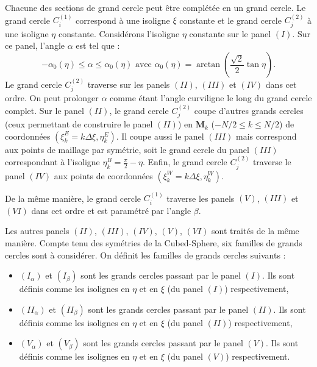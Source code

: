 Chacune des sections de grand cercle peut être complétée en un grand cercle. Le grand cercle $C_i^{(1)}$ correspond à une isoligne $\xi$ constante et le grand cercle $C_j^{(2)}$ à une isoligne $\eta$ constante. Considérons l'isoligne $\eta$ constante sur le panel $(I)$. Sur ce panel, l'angle $\alpha$ est tel que :
\begin{equation}
- \alpha_0 (\eta) \leq \alpha \leq \alpha_0(\eta) \text{ avec } \alpha_0( \eta) = \arctan \left( \dfrac{\sqrt{2}}{2} \tan \eta \right).
\end{equation}
Le grand cercle $C_j^{(2)}$ traverse sur les panels $(II)$, $(III)$ et $(IV)$ dans cet ordre. On peut prolonger $\alpha$ comme étant l'angle curviligne le long du grand cercle complet. Sur le panel $(II)$, le grand cercle $C_j^{(2)}$ coupe d'autres grands cercles (ceux permettant de construire le panel $(II)$) en $\mathbf{M}_k$ ($-N/2 \leq k \leq N/2$) de coordonnées $(\xi^E_k = k \Delta \xi, \eta^E_k)$. Il coupe aussi le panel $(III)$ mais correspond aux points de maillage par symétrie, soit le grand cercle du panel $(III)$ correspondant à l'isoligne $\eta^B_k = \frac{\pi}{2} - \eta$. Enfin, le grand cercle $C_j^{(2)}$ traverse le panel $(IV)$ aux points de coordonnées $(\xi^W_k = k \Delta \xi, \eta^W_k)$. 

De la même manière, le grand cercle $C_i^{(1)}$ traverse les panels $(V)$, $(III)$ et $(VI)$ dans cet ordre et est paramétré par l'angle $\beta$.

Les autres panels $(II)$, $(III)$, $(IV)$, $(V)$, $(VI)$ sont traités de la même manière. Compte tenu des symétries de la Cubed-Sphere, six familles de grands cercles sont à considérer. On définit les familles de grands cercles suivants :

\begin{itemize}
\item $(I_{\alpha})$ et $(I_{\beta})$ sont les grands cercles passant par le panel $(I)$. Ils sont définis comme les isolignes en $\eta$ et en $\xi$ (du panel $(I)$) respectivement,
\item $(II_{\alpha})$ et $(II_{\beta})$ sont les grands cercles passant par le panel $(II)$. Ils sont définis comme les isolignes en $\eta$ et en $\xi$ (du panel $(II)$) respectivement,
\item $(V_{\alpha})$ et $(V_{\beta})$ sont les grands cercles passant par le panel $(V)$. Ils sont définis comme les isolignes en $\eta$ et en $\xi$ (du panel $(V)$) respectivement.
\end{itemize}

